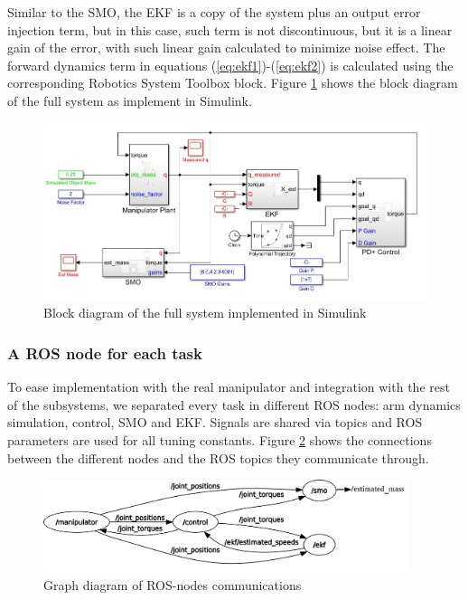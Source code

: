 \documentclass[smallextended]{svjour3}       %
\begin{document}
Similar to the SMO, the EKF is a copy of the system plus an output error injection term, but in this case, such term is not discontinuous, but it is a linear gain of the error, with such linear gain calculated to minimize noise effect. The forward dynamics term in equations (\ref{eq:ekf1})-(\ref{eq:ekf2}) is calculated using the corresponding Robotics System Toolbox block. Figure \ref{fig:FullSystemSimulink} shows the block diagram of the full system as implement in Simulink. 

\begin{figure}[h!]
  \centering
  \includegraphics[width=\textwidth]{Figures/MassEstimatorDiagram.jpg}
  \caption{Block diagram of the full system implemented in Simulink}
  \label{fig:FullSystemSimulink}
\end{figure}

\subsubsection*{A ROS node for each task}
To ease implementation with the real manipulator and integration with the rest of the subsystems, we separated every task in different ROS nodes: arm dynamics simulation, control, SMO and EKF. Signals are shared via topics and ROS parameters are used for all tuning constants. Figure \ref{fig:RosNodes} shows the connections between the different nodes and the ROS topics they communicate through. 
\begin{figure}[h!]
  \centering
  \includegraphics[width=0.95\textwidth]{Figures/rosgraph.png}
  \caption{Graph diagram of ROS-nodes communications}
  \label{fig:RosNodes}
\end{figure}
\end{document}
